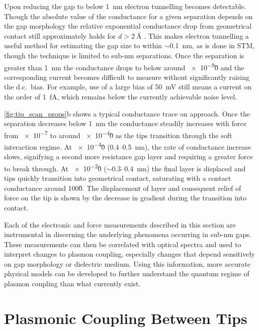 \documentclass[a4paper]{article}
\begin{document}
Upon reducing the gap to below \SI{1}{nm} electron tunnelling becomes detectable. Though the absolute value of the conductance for a given separation depends on the gap morphology the relative exponential conductance drop from geometrical contact still approximately holds for $d>\SI{2}{\angstrom}$ \cite{esteban2015}. This makes electron tunnelling a useful method for estimating the gap size to within $\sim$\SI{0.1}{nm}, as is done in STM, though the technique is limited to sub-nm separations. Once the separation is greater than \SI{1}{nm} the conductance drops to below around \num{e-9}\G0 and the corresponding current becomes difficult to measure without significantly raising the d.c.\ bias. For example, use of a large bias of \SI{50}{mV} still means a current on the order of \SI{1}{fA}, which remains below the currently achievable noise level.

\autoref{fig:tip_scan_props}b shows a typical conductance trace on approach. Once the separation decreases below \SI{1}{nm} the conductance steadily increases with force from \num{e-7} to around \num{e-4}\G0 as the tips transition through the soft interaction regime. At \num{e-4}\G0 (0.4--\SI{0.5}{nm}), the rate of conductance increase slows, signifying a second more resistance gap layer and requiring a greater force to break through. At \num{e-2}\G0 ($\sim$0.3--\SI{0.4}{nm}) the final layer is displaced and tips quickly transition into geometrical contact, saturating with a contact conductance around 100\G0. The displacement of layer and consequent relief of force on the tip is shown by the decrease in gradient during the transition into contact.

Each of the electronic and force measurements described in this section are instrumental in discerning the underlying phenomena occurring in sub-nm gaps. These measurements can then be correlated with optical spectra and used to interpret changes to plasmon coupling, especially changes that depend sensitively on gap morphology or dielectric medium. Using this information, more accurate physical models can be developed to further understand the quantum regime of plasmon coupling than what currently exist.

\section{Plasmonic Coupling Between Tips}
\end{document}
